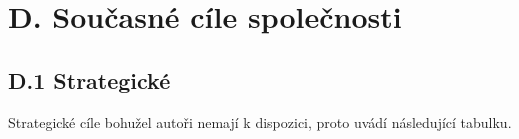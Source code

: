 
\newpage

\section*{D. Současné cíle společnosti}
\label{sec:Soucasne cile spolecnosti}



\subsection*{D.1 Strategické}
\label{sec:Strategicke}

Strategické cíle bohužel autoři nemají k dispozici, proto uvádí následující tabulku.\\

